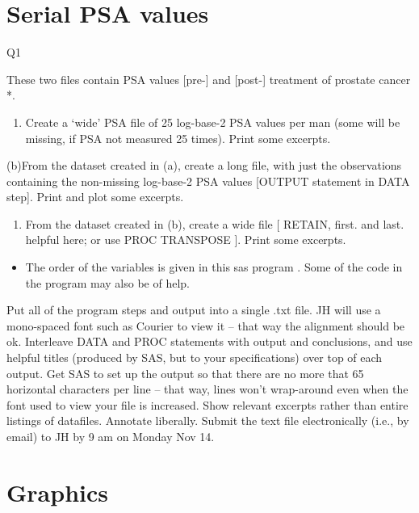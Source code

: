 \documentclass[]{book}
\providecommand{\tightlist}{%
  \setlength{\itemsep}{0pt}\setlength{\parskip}{0pt}}
\begin{document}
\hypertarget{serial-psa-values}{%
\section{Serial PSA values}\label{serial-psa-values}}

Q1

These two files contain PSA values {[}pre-{]} and {[}post-{]} treatment of prostate cancer *.

\begin{enumerate}
\def\labelenumi{(\alph{enumi})}
\tightlist
\item
  Create a `wide' PSA file of 25 log-base-2 PSA values per man (some will be missing, if PSA not measured 25 times). Print some excerpts.
\end{enumerate}

(b)From the dataset created in (a), create a long file, with just the observations containing the non-missing log-base-2 PSA values {[}OUTPUT statement in DATA step{]}. Print and plot some excerpts.

\begin{enumerate}
\def\labelenumi{(\alph{enumi})}
\setcounter{enumi}{2}
\tightlist
\item
  From the dataset created in (b), create a wide file {[} RETAIN, first. and last. helpful here; or use PROC TRANSPOSE {]}. Print some excerpts.
\end{enumerate}

\begin{itemize}
\tightlist
\item
  The order of the variables is given in this sas program . Some of the code in the program may also be of help.
\end{itemize}

Put all of the program steps and output into a single .txt file. JH will use a mono-spaced font such as Courier to view it -- that way the alignment should be ok. Interleave DATA and PROC statements with output and conclusions, and use helpful titles (produced by SAS, but to your specifications) over top of each output. Get SAS to set up the output so that there are no more that 65 horizontal characters per line -- that way, lines won't wrap-around even when the font used to view your file is increased. Show relevant excerpts rather than entire listings of datafiles. Annotate liberally. Submit the text file electronically (i.e., by email) to JH by 9 am on Monday Nov 14.

\hypertarget{graphics}{%
\section{Graphics}\label{graphics}}
\end{document}
